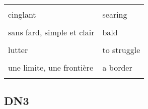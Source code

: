 \documentclass[
  10pt,
]{article}
\begin{document}
\begin{longtable}{ll}
\cellcolor{gray!6}{supporter, accepter} & \cellcolor{gray!6}{to bear}\\

cinglant & searing\\

\cellcolor{gray!6}{une hypothèse} & \cellcolor{gray!6}{an assumption}\\

sans fard, simple et clair & bald\\

\cellcolor{gray!6}{une tentative} & \cellcolor{gray!6}{an endeavour}\\

lutter & to struggle\\

\cellcolor{gray!6}{vaincre} & \cellcolor{gray!6}{to overcome}\\

une limite, une frontière & a border\\

\cellcolor{gray!6}{superficiel, peu profond} & \cellcolor{gray!6}{shallow}\\
\bottomrule
\end{longtable}

\hypertarget{dn3}{%
\subsection{DN3}\label{dn3}}
\end{document}
